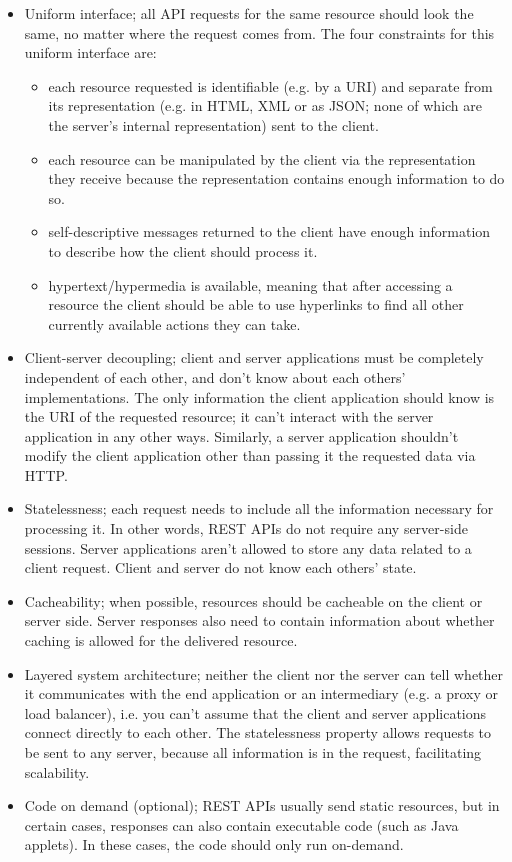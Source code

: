 \documentclass[table, xcdraw]{article}%
\begin{document}
\begin{itemize}
    \item Uniform interface; all API requests for the same resource should look the same, no matter where the request comes from. The four constraints for this uniform interface are:
    \begin{itemize}
        \item each resource requested is identifiable (e.g. by a URI) and separate from its representation (e.g. in HTML, XML or as JSON; none of which are the server's internal representation) sent to the client.
        \item each resource can be manipulated by the client via the representation they receive because the representation contains enough information to do so.
        \item self-descriptive messages returned to the client have enough information to describe how the client should process it.
        \item hypertext/hypermedia is available, meaning that after accessing a resource the client should be able to use hyperlinks to find all other currently available actions they can take.
    \end{itemize}
    \item Client-server decoupling; client and server applications must be completely independent of each other, and don't know about each others' implementations. The only information the client application should know is the URI of the requested resource; it can't interact with the server application in any other ways. Similarly, a server application shouldn't modify the client application other than passing it the requested data via HTTP.
    \item Statelessness; each request needs to include all the information necessary for processing it. In other words, REST APIs do not require any server-side sessions. Server applications aren’t allowed to store any data related to a client request. Client and server do not know each others' state.
    \item Cacheability; when possible, resources should be cacheable on the client or server side. Server responses also need to contain information about whether caching is allowed for the delivered resource.
    \item Layered system architecture; neither the client nor the server can tell whether it communicates with the end application or an intermediary (e.g. a proxy or load balancer), i.e. you can't assume that the client and server applications connect directly to each other. The statelessness property allows requests to be sent to any server, because all information is in the request, facilitating scalability.
    \item Code on demand (optional); REST APIs usually send static resources, but in certain cases, responses can also contain executable code (such as Java applets). In these cases, the code should only run on-demand.
\end{itemize}
\end{document}
